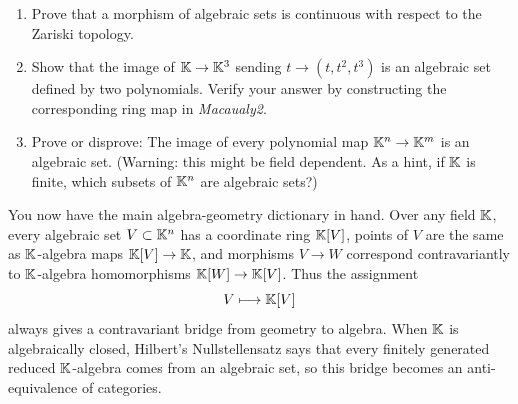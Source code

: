 \documentclass[12pt,reqno]{amsart}
\begin{document}
\begin{enumerate}[leftmargin=*]
\item Prove that a morphism of algebraic sets is continuous with respect to the Zariski topology.

\item Show that the image of $\mathbb{K} \to \mathbb{K}^3$ sending $t \to (t,t^2,t^3)$ is an algebraic set defined by two polynomials. Verify your answer by constructing the corresponding ring map in \textit{Macaualy2}. 

\item Prove or disprove: The image of every polynomial map $\mathbb{K}^n \to \mathbb{K}^m$ is an algebraic set. (Warning: this might be field dependent. As a hint, if $\mathbb{K}$ is finite, which subsets of $\mathbb{K}^n$ are algebraic sets?)
\end{enumerate}

\hrulefill

You now have the main algebra-geometry dictionary in hand. Over any field $\mathbb{K}$, every algebraic set $V \subset \mathbb{K}^n$ has a coordinate ring $\mathbb{K}[V]$, points of $V$ are the same as $\mathbb{K}$-algebra maps $\mathbb{K}[V]\to \mathbb{K}$, and morphisms $V \to W$ correspond contravariantly to $\mathbb{K}$-algebra homomorphisms $\mathbb{K}[W]\to \mathbb{K}[V]$. Thus the assignment
\[
V \longmapsto \mathbb{K}[V]
\]
always gives a contravariant bridge from geometry to algebra. When $\mathbb{K}$ is algebraically closed, Hilbert's Nullstellensatz says that every finitely generated reduced $\mathbb{K}$-algebra comes from an algebraic set, so this bridge becomes an anti-equivalence of categories.

\hrulefill
\end{document}
